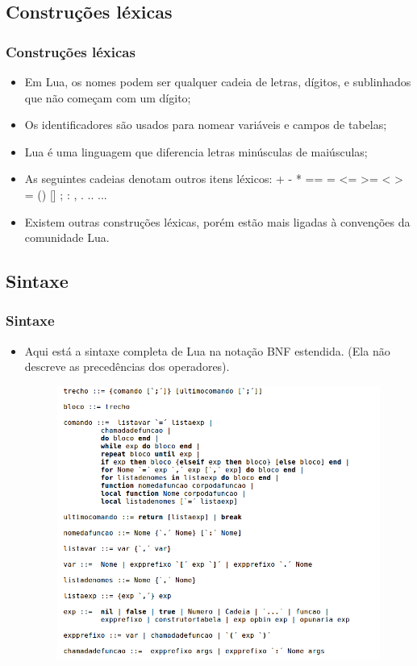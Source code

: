 ﻿\documentclass{beamer}
\begin{document}
\subsection{Construções léxicas}
\begin{frame}[fragile]
\frametitle{Construções léxicas}
	\begin{itemize}
	\item Em Lua, os nomes podem ser qualquer cadeia de letras, dígitos, e sublinhados que não começam com um dígito; 
	\item Os identificadores são usados para nomear variáveis e campos de tabelas;
	\item Lua é uma linguagem que diferencia letras minúsculas de maiúsculas;
	\item As seguintes cadeias denotam outros itens léxicos: + - * == = <= >= < > = () [] ; : , . .. ...
	\item Existem outras construções léxicas, porém estão mais ligadas à convenções da comunidade Lua.
	\end{itemize}
\end{frame}

\subsection{Sintaxe}
\begin{frame}[fragile]
\frametitle{Sintaxe}
	\begin{itemize}
	\item Aqui está a sintaxe completa de Lua na notação BNF estendida. (Ela não descreve as precedências dos operadores). 
	\begin{figure}[!htb]
		\centering
		\includegraphics[width=0.9\linewidth]{imagens/sintaxe1}
	\end{figure}
	\end{itemize}
\end{frame}
\end{document}
